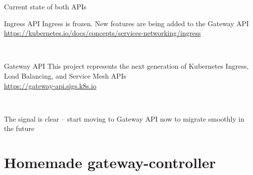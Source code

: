 \documentclass[11pt, aspectratio=169]{beamer}
\begin{document}
\begin{frame}{ Current state of both APIs}
	\begin{block}{Ingress API}
		Ingress is frozen. New features are being added to the Gateway API\\

		\url{https://kubernetes.io/docs/concepts/services-networking/ingress}
	\end{block}~

	\begin{block}{Gateway API}
		This project represents the next generation of Kubernetes Ingress,
		Load Balancing, and Service Mesh APIs\\

		\url{https://gateway-api.sigs.k8s.io}
	\end{block}~

	The signal is clear – start moving to Gateway API now to migrate smoothly in the future
\end{frame}

\section{Homemade gateway-controller}
\end{document}
